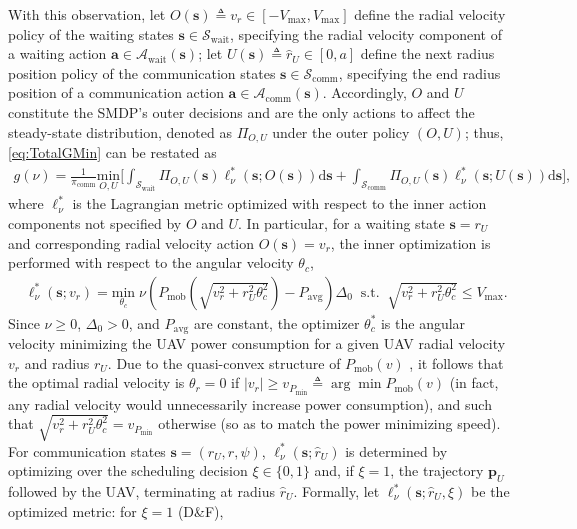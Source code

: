 \documentclass[12pt, draftcls, onecolumn]{IEEEtran}
\theoremstyle{plain}
\theoremstyle{definition}
\theoremstyle{remark}
\begin{document}
With this observation, let $O(\mathbf{s}){\triangleq}v_{r}{\in}[-V_{\mathrm{max}},V_{\mathrm{max}}]$ define the radial velocity policy of the {waiting} states $\mathbf{s}{\in}\mathcal{S}_{\mathrm{wait}}$, specifying the radial velocity component of a waiting action $\mathbf{a}{\in}\mathcal{A}_{\mathrm{wait}}(\mathbf{s})$; let $U(\mathbf{s}){\triangleq}\hat{r}_{U}{\in}[0,a]$ define the next radius position policy of the {communication} states $\mathbf{s}{\in}\mathcal{S}_{\mathrm{comm}}$, specifying the end radius position of a communication action $\mathbf{a}{\in}\mathcal{A}_{\mathrm{comm}}(\mathbf{s})$. Accordingly, $O$ and $U$ constitute the SMDP's outer decisions and are the only actions to affect the steady-state distribution, denoted as $\Pi_{O,U}$ under the outer policy $(O,U)$; thus, \eqref{eq:TotalGMin} can be restated as
\begin{align}\label{eq:PolDecomp}
	g(\nu) = \frac{1}{\pi_{\mathrm{comm}}} \underset{O,U}{\mathrm{min}} \Bigr[ \int_{\mathcal{S}_{\mathrm{wait}}} \Pi_{O,U}(\mathbf{s}) \ell_{\nu}^{*}(\mathbf{s}; O(\mathbf{s}))\mathrm{d}\mathbf{s} + \int_{\mathcal{S}_{\mathrm{comm}}} \Pi_{O,U}(\mathbf{s}) \ell_{\nu}^{*}(\mathbf{s}; U(\mathbf{s})) \mathrm{d}\mathbf{s} \Bigr],
\end{align}
where $\ell_{\nu}^{*}$ is the Lagrangian metric optimized with respect to the {inner action} components not specified by $O$ and $U$. In particular, for a waiting state $\mathbf{s}{=}r_{U}$ and corresponding radial velocity action $O(\mathbf{s}){=}v_{r}$, the inner optimization is performed with respect to the angular velocity $\theta_{c}$,
\begin{align}\label{eq:MinLWP}
	&\ell_{\nu}^{*}(\mathbf{s}; v_r) = \underset{\theta_c}{\mathrm{min}}\; \nu \left( P_{\mathrm{mob}}\left(\sqrt{v_{r}^2 + r_U^2\theta_c^2}\right) - P_{\mathrm{avg}} \right)\Delta_0 \;\; \mathrm{s.t.}\;\; \sqrt{v_{r}^{2} + r_U^2\theta_c^2} \leq V_{\mathrm{max}}.
\end{align}
Since $\nu{\geq}0$, $\Delta_{0}{>}0$, and $P_{\mathrm{avg}}$ are constant, the optimizer $\theta_{c}^{*}$ is the angular velocity minimizing the UAV power consumption for a given UAV radial velocity $v_{r}$ and radius $r_{U}$. Due to the quasi-convex structure of $P_{\mathrm{mob}}(v)$ \cite{SCA}, it follows that the optimal radial velocity is 
$\theta_r=0$ if $|v_r|\geq v_{P_{\mathrm{min}}}\triangleq\arg\min P_{\mathrm{mob}}(v)$ (in fact, any radial velocity would unnecessarily increase power consumption), and such that $\sqrt{v_{r}^2 + r_U^2\theta_c^2}=v_{P_{\mathrm{min}}}$ otherwise (so as to match the power minimizing speed). For communication states $\mathbf{s}{=}(r_{U},r,\psi)$, $\ell_{\nu}^{*}(\mathbf{s};\hat{r}_{U})$ is determined by optimizing over the scheduling decision $\xi{\in}\{0,1\}$ and, if $\xi{=}1$, the trajectory $\mathbf{p}_{U}$ followed by the UAV, terminating at radius $\hat{r}_{U}$. Formally, let $\ell_{\nu}^{*}(\mathbf{s};\hat{r}_{U},\xi)$ be the optimized metric: for $\xi{=}1$ (D\&F),
\end{document}

